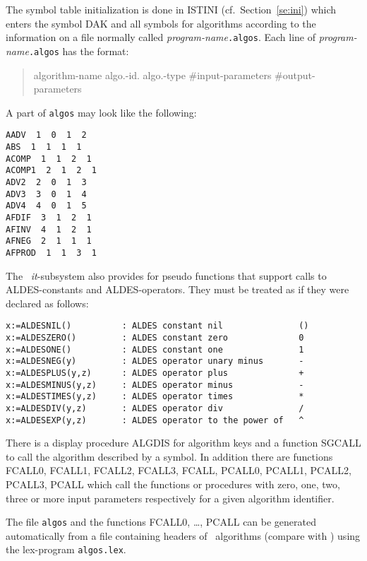 The symbol table initialization is done in ISTINI (cf.\ Section~\ref{se:ini})
which enters the symbol 
DAK and all symbols for algorithms according to the information on a file
normally called {\it program-name}{\tt .algos}. 
Each line of {\it program-name}{\tt .algos} has the format:
\begin{quote}
  algorithm-name algo.-id. algo.-type \#input-parameters \#output-parameters
\end{quote}
\begin{example} A part of {\tt algos} may look like the following:
\begin{verbatim}
AADV  1  0  1  2
ABS  1  1  1  1
ACOMP  1  1  2  1
ACOMP1  2  1  2  1
ADV2  2  0  1  3
ADV3  3  0  1  4
ADV4  4  0  1  5
AFDIF  3  1  2  1
AFINV  4  1  2  1
AFNEG  2  1  1  1
AFPROD  1  1  3  1
\end{verbatim}
\end{example}
The \redux\ {\it it}-subsystem also provides for pseudo functions that
support calls to ALDES-constants and ALDES-operators.
They must be treated as if they were declared as follows:
\begin{verbatim}
x:=ALDESNIL()          : ALDES constant nil               ()
x:=ALDESZERO()         : ALDES constant zero              0
x:=ALDESONE()          : ALDES constant one               1
x:=ALDESNEG(y)         : ALDES operator unary minus       -
x:=ALDESPLUS(y,z)      : ALDES operator plus              +
x:=ALDESMINUS(y,z)     : ALDES operator minus             -
x:=ALDESTIMES(y,z)     : ALDES operator times             *
x:=ALDESDIV(y,z)       : ALDES operator div               /
x:=ALDESEXP(y,z)       : ALDES operator to the power of   ^
\end{verbatim} 


There is a display procedure ALGDIS for algorithm keys and a function
SGCALL to call the algorithm described by a symbol.
In addition there are functions FCALL0, FCALL1, FCALL2, FCALL3, FCALL,
PCALL0, PCALL1, PCALL2, PCALL3, PCALL which call the functions or procedures
with zero, one, two, three or more input parameters respectively
for a given algorithm identifier.

The file {\tt algos} and the functions FCALL0, \ldots, PCALL can be
generated automatically from a file containing headers of \ALDES\ algorithms
(compare with \RIX) using the lex-program 
{\tt algos.lex}.




